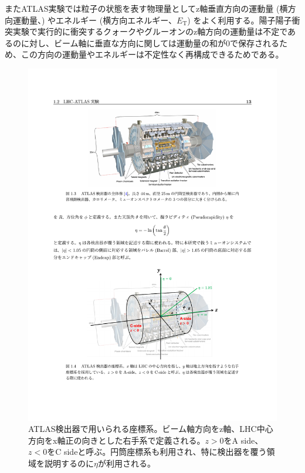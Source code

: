 またATLAS実験では粒子の状態を表す物理量としてz軸垂直方向の運動量 (横方向運動量、\pt) やエネルギー (横方向エネルギー、$E_{\mathrm{T}}$) をよく利用する。陽子陽子衝突実験で実行的に衝突するクォークやグルーオンのz軸方向の運動量は不定であるのに対し、ビーム軸に垂直な方向に関しては運動量の和が0で保存されるため、この方向の運動量やエネルギーは不定性なく再構成できるためである。
\begin{figure} 
\centering
\includegraphics[width=16cm]{fig/Intro/ATLAScordination.pdf}
\caption[ATLAS検出器における座標系]{ATLAS検出器で用いられる座標系。ビーム軸方向をz軸、LHC中心方向をx軸正の向きとした右手系で定義される。$z>0$をA side、$z<0$をC sideと呼ぶ。円筒座標系も利用され、特に検出器を覆う領域を説明するのに$\eta$が利用される。}
\label{ATLAScordination}
\end{figure}

